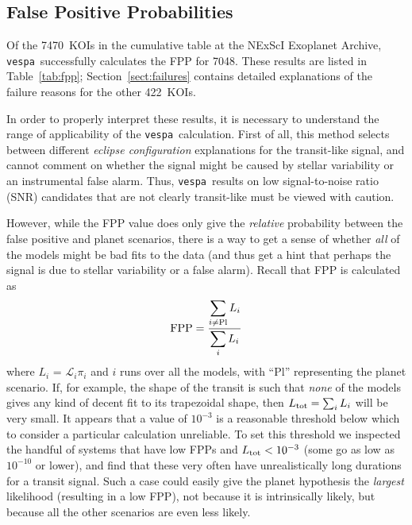 \documentclass{emulateapj}
\newcommand{\Tab}[1]{Table~\ref{tab:#1}}
\newcommand{\tab}[1]{\Tab{#1}}
\newcommand{\eqlabel}[1]{\label{eq:#1}}
\newcommand{\sectionname}{Section}
\newcommand{\Sect}[1]{\sectionname~\ref{sect:#1}}
\newcommand{\sect}[1]{\Sect{#1}}
\newcommand{\sectlabel}[1]{\label{sect:#1}}
\newcommand{\ntotal}{7470}
\newcommand{\nfail}{422}
\newcommand{\ncalc}{7048}
\newcommand{\vespa}{\texttt{vespa}}
\begin{document}

\subsection{False Positive Probabilities}
\sectlabel{results:fpp}

Of the \ntotal\ KOIs in the cumulative table at the NExScI Exoplanet
Archive, \vespa\ successfully calculates the FPP for \ncalc.  These
results are listed in \tab{fpp};  \sect{failures} contains detailed
explanations of the failure reasons for the other \nfail\ KOIs.

In order to properly interpret these results, it is necessary to
understand the range of applicability of the \vespa\ calculation.
First of all, this method selects between different \emph{eclipse
  configuration} explanations for the transit-like signal, and cannot
comment on whether the signal might be caused by stellar variability
or an instrumental false alarm.  Thus, \vespa\ results on low
signal-to-noise ratio (SNR) candidates that are not clearly
transit-like must be viewed with caution.  

However, while the FPP value does only give the \emph{relative}
probability between the false positive and planet scenarios, there is
a way to get a sense of whether \emph{all} of the models might be bad
fits to the data (and thus get a hint that perhaps the signal is due
to stellar variability or a false alarm).  Recall that FPP is
calculated as
\begin{equation}
\eqlabel{fpp}
{\rm FPP} = \frac{\displaystyle\sum_{i \neq {\rm Pl}}
  L_i}{\displaystyle \sum_i L_i}
\end{equation}
where $L_i$ = $\mathcal L_i \pi_i$ and $i$ runs over all the models,
with ``Pl'' representing the planet scenario.  If, for example, the
shape of the transit is such that \emph{none} of the models gives any
kind of decent fit to its trapezoidal shape, then $L_{\rm tot} =
\sum_i L_i$ will be very small.  It appears that a value of $10^{-3}$
is a reasonable threshold below which to consider a particular
calculation unreliable.  To set this threshold we inspected the
handful of systems that have low FPPs and $L_{\rm tot} < 10^{-3}$
(some go as low as $10^{-10}$ or lower), and find that these very
often have unrealistically long durations for a transit signal.  Such
a case could easily give the planet hypothesis the \emph{largest}
likelihood (resulting in a low FPP), not because it is intrinsically
likely, but because all the other scenarios are even less likely.
\end{document}
